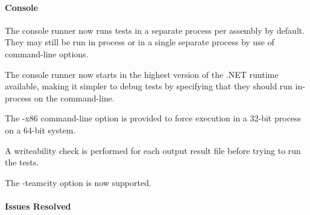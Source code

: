 \paragraph*{Console}


\begin{DoxyItemize}
\item The console runner now runs tests in a separate process per assembly by default. They may still be run in process or in a single separate process by use of command-\/line options.
\item The console runner now starts in the highest version of the .N\+ET runtime available, making it simpler to debug tests by specifying that they should run in-\/process on the command-\/line.
\item The -\/x86 command-\/line option is provided to force execution in a 32-\/bit process on a 64-\/bit system.
\item A writeability check is performed for each output result file before trying to run the tests.
\item The -\/teamcity option is now supported.
\end{DoxyItemize}

\paragraph*{Issues Resolved}


